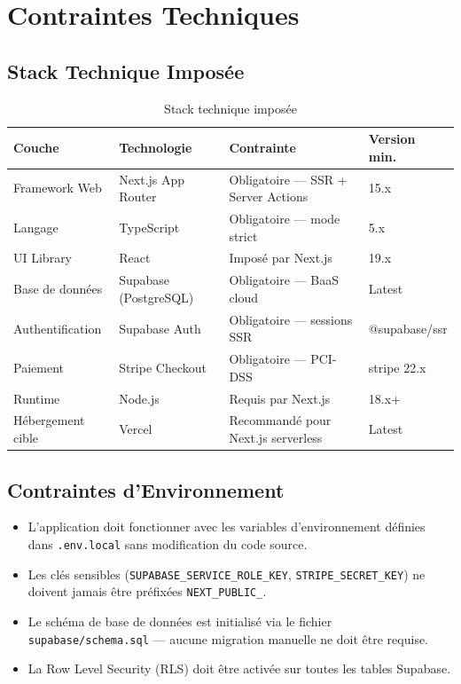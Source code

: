 \documentclass[12pt,a4paper,openany]{report}
\begin{document}
\chapter{Contraintes Techniques}

\section{Stack Technique Imposée}

\begin{table}[H]
\centering
\begin{tabularx}{\textwidth}{llXl}
\toprule
\textbf{Couche} & \textbf{Technologie} & \textbf{Contrainte} & \textbf{Version min.} \\
\midrule
Framework Web      & Next.js App Router  & Obligatoire — SSR + Server Actions & 15.x \\
Langage            & TypeScript          & Obligatoire — mode strict          & 5.x \\
UI Library         & React               & Imposé par Next.js                 & 19.x \\
Base de données    & Supabase (PostgreSQL) & Obligatoire — BaaS cloud          & Latest \\
Authentification   & Supabase Auth       & Obligatoire — sessions SSR         & @supabase/ssr \\
Paiement           & Stripe Checkout     & Obligatoire — PCI-DSS              & stripe 22.x \\
Runtime            & Node.js             & Requis par Next.js                 & 18.x+ \\
Hébergement cible  & Vercel              & Recommandé pour Next.js serverless & Latest \\
\bottomrule
\end{tabularx}
\caption{Stack technique imposée}
\end{table}

\section{Contraintes d'Environnement}

\begin{itemize}
  \item L'application doit fonctionner avec les variables d'environnement définies dans \texttt{.env.local} sans modification du code source.
  \item Les clés sensibles (\texttt{SUPABASE\_SERVICE\_ROLE\_KEY}, \texttt{STRIPE\_SECRET\_KEY}) ne doivent jamais être préfixées \texttt{NEXT\_PUBLIC\_}.
  \item Le schéma de base de données est initialisé via le fichier \texttt{supabase/schema.sql} — aucune migration manuelle ne doit être requise.
  \item La Row Level Security (RLS) doit être activée sur toutes les tables Supabase.
\end{itemize}
\end{document}

